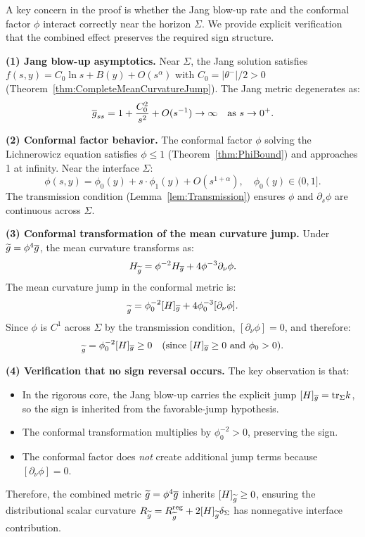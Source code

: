 \begin{remark}\label{rem:JangConformalInteraction}
A key concern in the proof is whether the Jang blow-up rate and the conformal factor $\phi$ interact correctly near the horizon $\Sigma$. We provide explicit verification that the combined effect preserves the required sign structure.

\textbf{(1) Jang blow-up asymptotics.} Near $\Sigma$, the Jang solution satisfies $f(s,y) = C_0 \ln s + B(y) + O(s^\alpha)$ with $C_0 = |\theta^-|/2 > 0$ (Theorem~\ref{thm:CompleteMeanCurvatureJump}). The Jang metric degenerates as:
\begin{equation}
    \overline{g}_{ss} = 1 + \frac{C_0^2}{s^2} + O(s^{-1}) \to \infty \quad \text{as } s \to 0^+.
\end{equation}

\textbf{(2) Conformal factor behavior.} The conformal factor $\phi$ solving the Lichnerowicz equation satisfies $\phi \le 1$ (Theorem~\ref{thm:PhiBound}) and approaches 1 at infinity. Near the interface $\Sigma$:
\begin{equation}
    \phi(s,y) = \phi_0(y) + s \cdot \phi_1(y) + O(s^{1+\alpha}), \quad \phi_0(y) \in (0,1].
\end{equation}
The transmission condition (Lemma~\ref{lem:Transmission}) ensures $\phi$ and $\partial_s \phi$ are continuous across $\Sigma$.

\textbf{(3) Conformal transformation of the mean curvature jump.} Under $\widetilde{g} = \phi^4 \overline{g}$, the mean curvature transforms as:
\begin{equation}
    H_{\widetilde{g}} = \phi^{-2} H_{\overline{g}} + 4\phi^{-3} \partial_\nu \phi.
\end{equation}
The mean curvature jump in the conformal metric is:
\begin{equation}
    [H]_{\tg} = \phi_0^{-2} [H]_{\bg} + 4\phi_0^{-3} [\partial_\nu \phi].
\end{equation}
Since $\phi$ is $C^1$ across $\Sigma$ by the transmission condition, $[\partial_\nu \phi] = 0$, and therefore:
\begin{equation}
    [H]_{\tg} = \phi_0^{-2} [H]_{\bg} \ge 0 \quad \text{(since } [H]_{\bg} \ge 0 \text{ and } \phi_0 > 0\text{)}.
\end{equation}

\textbf{(4) Verification that no sign reversal occurs.} The key observation is that:
\begin{itemize}
    \item In the rigorous core, the Jang blow-up carries the explicit jump $[H]_{\overline{g}}=\mathrm{tr}_\Sigma k$, so the sign is inherited from the favorable-jump hypothesis.
    \item The conformal transformation multiplies by $\phi_0^{-2} > 0$, preserving the sign.
    \item The conformal factor does \emph{not} create additional jump terms because $[\partial_\nu \phi] = 0$.
\end{itemize}
Therefore, the combined metric $\widetilde{g} = \phi^4 \overline{g}$ inherits $[H]_{\widetilde{g}} \ge 0$, ensuring the distributional scalar curvature $R_{\widetilde{g}} = R_{\widetilde{g}}^{\mathrm{reg}} + 2[H]_{\widetilde{g}} \delta_\Sigma$ has nonnegative interface contribution.


\end{remark}
